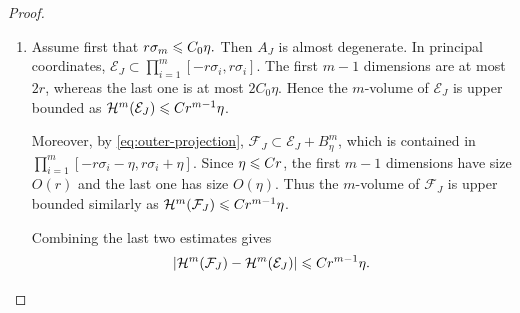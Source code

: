 \begin{proof}
\begin{enumerate}
\item Assume first that
\(r\sigma_m\leqslant C_0\eta.\)
Then $A_J$ is almost degenerate. In principal coordinates,
\(\mathcal E_J\subset\prod_{i=1}^m[-r\sigma_i,r\sigma_i].\)
The first $m-1$ dimensions are at most $2r$, whereas the last one is
at most $2C_0\eta$. Hence the $m$-volume of $\mathcal E_J$ is upper bounded as
 $\mathcal{H}^m(\mathcal E_J)\leqslant C r^{m-1}\eta$.

Moreover, by \eqref{eq:outer-projection},
$\mathcal F_J\subset\mathcal E_J+B^m_\eta$, which is contained in
\(\prod_{i=1}^m[-r\sigma_i-\eta,r\sigma_i+\eta].\)
Since $\eta\leqslant Cr$, the first $m-1$ dimensions have size $O(r)$ and
the last one has size $O(\eta)$. Thus the $m$-volume of $\mathcal F_J$ is upper bounded similarly as
$\mathcal{H}^m(\mathcal F_J)\leqslant C r^{m-1}\eta$.

Combining the last two estimates gives
\begin{equation}
\label{eq:degenerate-result}
 \left|\mathcal{H}^m(\mathcal F_J)-\mathcal{H}^m(\mathcal E_J)\right|
 \leqslant C r^{m-1}\eta.
\end{equation}


\end{enumerate}
\end{proof}
